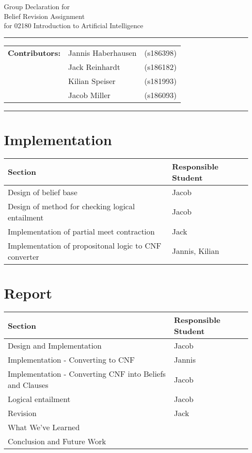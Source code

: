 \documentclass[a4paper,10pt]{article}
\begin{document}
\begin{center}
Group Declaration for\\
\vspace{0.5cm}
{{\Large \sc Belief Revision Assignment}}\\
\vspace{0.5cm} for 02180 Introduction to Artificial Intelligence
\end{center}
\rule{\textwidth}{0.5pt}
\begin{description}
\item\begin{tabular}{rll}
    \textbf{Contributors:}& Jannis Haberhausen &(s186398)\\ & Jack Reinhardt &(s186182)\\ & Kilian Speiser &(s181993)\\ & Jacob Miller &(s186093) \\
\end{tabular}
\end{description}
\rule{\textwidth}{1pt}


\section*{\large{Implementation}}
\begin{table}[!ht]
\centering
\begin{tabular}{l|l} \hline
    \textbf{Section} & \textbf{Responsible Student} \\ \hline
    Design of belief base                               & Jacob \\
    Design of method for checking logical entailment    & Jacob \\
    Implementation of partial meet contraction          & Jack \\
    Implementation of propositonal logic to CNF converter & Jannis, Kilian \\
\end{tabular}
\end{table}

\section*{\large{Report}}
\begin{table}[!ht]
\centering
\begin{tabular}{l|l} \hline
    \textbf{Section} & \textbf{Responsible Student} \\ \hline
    Design and Implementation           & Jacob \\
    Implementation - Converting to CNF  & Jannis \\
    Implementation - Converting CNF into Beliefs and Clauses & Jacob \\
    Logical entailment                  & Jacob \\
    Revision                            & Jack \\
    What We've Learned                  & \\
    Conclusion and Future Work          & \\
\end{tabular}
\end{table}
\end{document}
